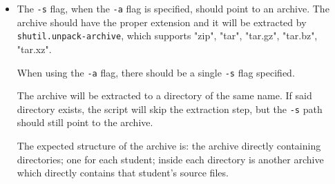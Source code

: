 \documentclass[a4paper,12pt]{article}
\begin{document}
\begin{itemize}
\begin{itemize}
[1, 2, 3, 4, 5, 6]

[2, 3, 4, 5, 6, 7]

------------------------------------------------

The given solution is correct.

------------------------------------------------

------------------------------------------------

------------------------------------------------

------------------------------------------------

        Evaluating sampleSolutions/genPrimes.ml:

------------------------------------------------

For the correct answer:

[2, 3, 5, 7, 11, 13, 17, 19]: int list

[2, 3, 5, 7, 11, 13, 17, 19, 23, 29]: int list

------------------------------------------------

The source file 

        sampleSolutions/genPrimes.ml

has produced the answer:

[2, 3, 5, 7]: int list

[2, 3, 5, 7, 11, 13, 17, 19]: int list

------------------------------------------------

The given solution is wrong.

------------------------------------------------
 
  \item
   The \texttt{-s} flag, when the \texttt{-a} flag is specified, should point to an archive. The archive should have the proper extension and it will be extracted by \texttt{shutil.unpack-archive}, which supports "zip", "tar", "tar.gz", "tar.bz", "tar.xz". 
   
   When using the \texttt{-a} flag, there should be a single \texttt{-s} flag specified.
   
   The archive will be extracted to a directory of the same name. If said directory exists, the script will skip the extraction step, but the \texttt{-s} path should still point to the archive.
   
   The expected structure of the archive is: the archive directly containing directories; one for each student; inside each directory is another archive which directly contains that student's source files.
   

\end{itemize}
\end{itemize}
\end{document}
